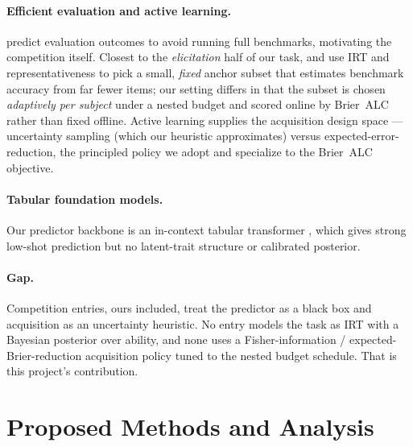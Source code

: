 \documentclass{article}
\begin{document}
\paragraph{Efficient evaluation and active learning.}
\citet{truong2025amortized} predict evaluation outcomes to avoid running full
benchmarks, motivating the competition itself. Closest to the \emph{elicitation}
half of our task, \citet{polo2024tinybenchmarks} and \citet{vivek2024anchor} use
IRT and representativeness to pick a small, \emph{fixed} anchor subset that
estimates benchmark accuracy from far fewer items; our setting differs in that the
subset is chosen \emph{adaptively per subject} under a nested budget and scored
online by Brier~ALC rather than fixed offline. Active learning
\citep{settles2009} supplies the acquisition design space --- uncertainty
sampling (which our heuristic approximates) versus expected-error-reduction, the
principled policy we adopt and specialize to the Brier~ALC objective.

\paragraph{Tabular foundation models.} Our predictor backbone is an in-context
tabular transformer \citep{hollmann2023tabpfn, ye2025tabicl}, which gives strong
low-shot prediction but no latent-trait structure or calibrated posterior.

\paragraph{Gap.} Competition entries, ours included, treat the predictor as a
black box and acquisition as an uncertainty heuristic. No entry models the task as
IRT with a Bayesian posterior over ability, and none uses a Fisher-information /
expected-Brier-reduction acquisition policy tuned to the nested budget schedule.
That is this project's contribution.

\section{Proposed Methods and Analysis}
\end{document}

